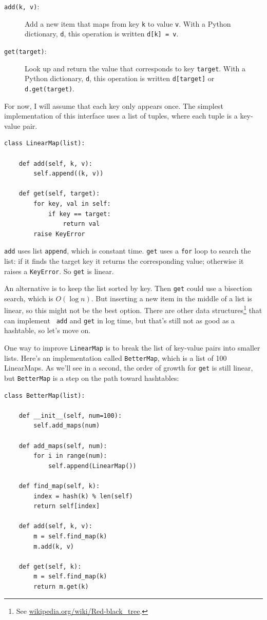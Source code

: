 \documentclass[10pt]{book}
\begin{document}
\begin{description}

\item[{\tt add(k, v)}:] Add a new item that maps from key {\tt k}
to value {\tt v}.  With a Python dictionary, {\tt d}, this operation
is written {\tt d[k] = v}.

\item[{\tt get(target)}:] Look up and return the value that corresponds
to key {\tt target}.  With a Python dictionary, {\tt d}, this operation
is written {\tt d[target]} or {\tt d.get(target)}.

\end{description}

For now, I will assume that each key only appears once.
The simplest implementation of this interface uses a list of
tuples, where each tuple is a key-value pair.


\begin{verbatim}
class LinearMap(list):

    def add(self, k, v):
        self.append((k, v))

    def get(self, target):
        for key, val in self:
            if key == target:
                return val
        raise KeyError
\end{verbatim}

{\tt add} uses list {\tt append}, which is constant
time.  {\tt get} uses a {\tt for} loop to search the list:
if it finds the target key it returns the corresponding value;
otherwise it raises a {\tt KeyError}.
So {\tt get} is linear.

An alternative is to keep the list sorted by key.  Then {\tt get}
could use a bisection search, which is $O(\log n)$.  But inserting a
new item in the middle of a list is linear, so this might not be the
best option.  There are other data structures\footnote{See
  \url{wikipedia.org/wiki/Red-black_tree}.}  that can implement {\tt
  add} and {\tt get} in log time, but that's still not as good as a
hashtable, so let's move on.

One way to improve {\tt LinearMap} is to break the list of key-value
pairs into smaller lists.  Here's an implementation called
{\tt BetterMap}, which is a list of 100 LinearMaps.  As we'll see
in a second, the order of growth for {\tt get} is still linear,
but {\tt BetterMap} is a step on the path toward hashtables:

\begin{verbatim}
class BetterMap(list):

    def __init__(self, num=100):
        self.add_maps(num)
        
    def add_maps(self, num):
        for i in range(num):
            self.append(LinearMap())

    def find_map(self, k):
        index = hash(k) % len(self)
        return self[index]

    def add(self, k, v):
        m = self.find_map(k)
        m.add(k, v)

    def get(self, k):
        m = self.find_map(k)
        return m.get(k)
\end{verbatim}
\end{document}
